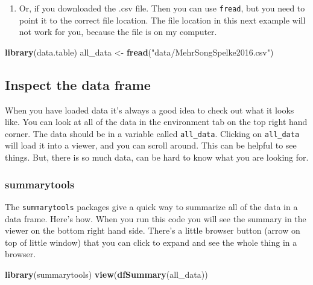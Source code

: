 \documentclass[]{book}
\newenvironment{Shaded}{\begin{snugshade}}{\end{snugshade}}
\newcommand{\KeywordTok}[1]{\textcolor[rgb]{0.13,0.29,0.53}{\textbf{#1}}}
\newcommand{\StringTok}[1]{\textcolor[rgb]{0.31,0.60,0.02}{#1}}
\newcommand{\NormalTok}[1]{#1}
\providecommand{\tightlist}{%
  \setlength{\itemsep}{0pt}\setlength{\parskip}{0pt}}
\begin{document}
\begin{enumerate}
\def\labelenumi{\arabic{enumi}.}
\setcounter{enumi}{1}
\tightlist
\item
  Or, if you downloaded the .csv file. Then you can use \texttt{fread},
  but you need to point it to the correct file location. The file
  location in this next example will not work for you, because the file
  is on my computer.
\end{enumerate}

\begin{Shaded}
\begin{Highlighting}[]
\KeywordTok{library}\NormalTok{(data.table)}
\NormalTok{all_data <-}\StringTok{ }\KeywordTok{fread}\NormalTok{(}\StringTok{"data/MehrSongSpelke2016.csv"}\NormalTok{)}
\end{Highlighting}
\end{Shaded}

\subsection{Inspect the data frame}\label{inspect-the-data-frame}

When you have loaded data it's always a good idea to check out what it
looks like. You can look at all of the data in the environment tab on
the top right hand corner. The data should be in a variable called
\texttt{all\_data}. Clicking on \texttt{all\_data} will load it into a
viewer, and you can scroll around. This can be helpful to see things.
But, there is so much data, can be hard to know what you are looking
for.

\subsubsection{summarytools}\label{summarytools-1}

The \texttt{summarytools} packages give a quick way to summarize all of
the data in a data frame. Here's how. When you run this code you will
see the summary in the viewer on the bottom right hand side. There's a
little browser button (arrow on top of little window) that you can click
to expand and see the whole thing in a browser.

\begin{Shaded}
\begin{Highlighting}[]
\KeywordTok{library}\NormalTok{(summarytools)}
\KeywordTok{view}\NormalTok{(}\KeywordTok{dfSummary}\NormalTok{(all_data))}
\end{Highlighting}
\end{Shaded}
\end{document}
